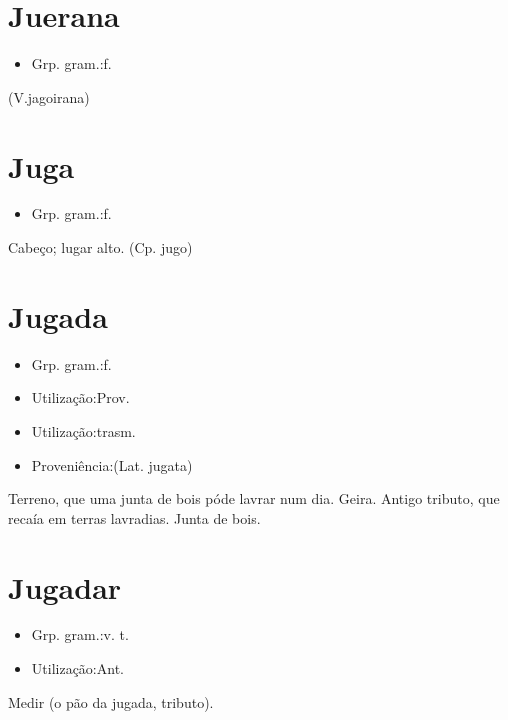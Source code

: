 \documentclass{article}
\begin{document}
\section{Juerana}
\begin{itemize}
\item {Grp. gram.:f.}
\end{itemize}
(V.jagoirana)
\section{Juga}
\begin{itemize}
\item {Grp. gram.:f.}
\end{itemize}
Cabeço; lugar alto.
(Cp. \textunderscore jugo\textunderscore )
\section{Jugada}
\begin{itemize}
\item {Grp. gram.:f.}
\end{itemize}
\begin{itemize}
\item {Utilização:Prov.}
\end{itemize}
\begin{itemize}
\item {Utilização:trasm.}
\end{itemize}
\begin{itemize}
\item {Proveniência:(Lat. \textunderscore jugata\textunderscore )}
\end{itemize}
Terreno, que uma junta de bois póde lavrar num dia.
Geira.
Antigo tributo, que recaía em terras lavradias.
Junta de bois.
\section{Jugadar}
\begin{itemize}
\item {Grp. gram.:v. t.}
\end{itemize}
\begin{itemize}
\item {Utilização:Ant.}
\end{itemize}
Medir (o pão da jugada, tributo).
\end{document}
